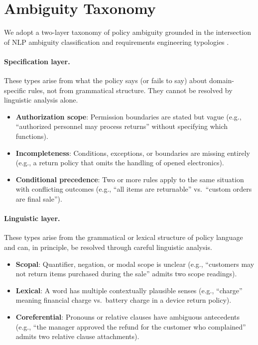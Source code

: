 \documentclass[11pt,a4paper]{article}
\begin{document}
\section{Ambiguity Taxonomy}

We adopt a two-layer taxonomy of policy ambiguity grounded in the intersection of NLP ambiguity classification \cite{li2024ambiguity} and requirements engineering typologies \cite{massey2014identifying,berry2003ambiguity}.

\paragraph{Specification layer.} These types arise from what the policy says (or fails to say) about domain-specific rules, not from grammatical structure. They cannot be resolved by linguistic analysis alone.

\begin{itemize}
\item \textbf{Authorization scope}: Permission boundaries are stated but vague (e.g., ``authorized personnel may process returns'' without specifying which functions).
\item \textbf{Incompleteness}: Conditions, exceptions, or boundaries are missing entirely (e.g., a return policy that omits the handling of opened electronics).
\item \textbf{Conditional precedence}: Two or more rules apply to the same situation with conflicting outcomes (e.g., ``all items are returnable'' vs.\ ``custom orders are final sale'').
\end{itemize}

\paragraph{Linguistic layer.} These types arise from the grammatical or lexical structure of policy language and can, in principle, be resolved through careful linguistic analysis.

\begin{itemize}
\item \textbf{Scopal}: Quantifier, negation, or modal scope is unclear (e.g., ``customers may not return items purchased during the sale'' admits two scope readings).
\item \textbf{Lexical}: A word has multiple contextually plausible senses (e.g., ``charge'' meaning financial charge vs.\ battery charge in a device return policy).
\item \textbf{Coreferential}: Pronouns or relative clauses have ambiguous antecedents (e.g., ``the manager approved the refund for the customer who complained'' admits two relative clause attachments).
\end{itemize}
\end{document}
